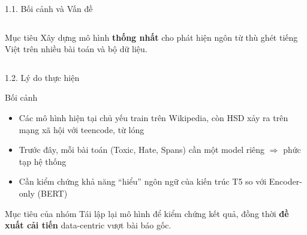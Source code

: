 \documentclass[11pt, aspectratio=169]{beamer}
\begin{document}
\begin{frame}[fragile, shrink=10]{1.1. Bối cảnh và Vấn đề}
\begin{columns}[T]
  \vspace{0.3cm}
  \begin{block}{Mục tiêu}
    Xây dựng mô hình \textbf{thống nhất} cho phát hiện ngôn từ thù ghét tiếng Việt trên nhiều bài toán và bộ dữ liệu.
  \end{block}
\end{columns}
\end{frame}

\begin{frame}{1.2. Lý do thực hiện}
\scriptsize

\begin{block}{Bối cảnh}
  \begin{itemize}
    \item Các mô hình hiện tại chủ yếu train trên Wikipedia, còn HSD xảy ra trên mạng xã hội với teencode, từ lóng
    \item Trước đây, mỗi bài toán (Toxic, Hate, Spans) cần một model riêng $\Rightarrow$ phức tạp hệ thống
    \item Cần kiểm chứng khả năng ``hiểu'' ngôn ngữ của kiến trúc T5 so với Encoder-only (BERT)
  \end{itemize}
\end{block}

\vspace{0.3cm}
\centering
\renewcommand{\arraystretch}{1.15}

\vspace{0.3cm}
\begin{block}{Mục tiêu của nhóm}
  Tái lập lại mô hình để kiểm chứng kết quả, đồng thời \textbf{đề xuất cải tiến} data-centric vượt bài báo gốc.
\end{block}
\end{frame}
\end{document}
